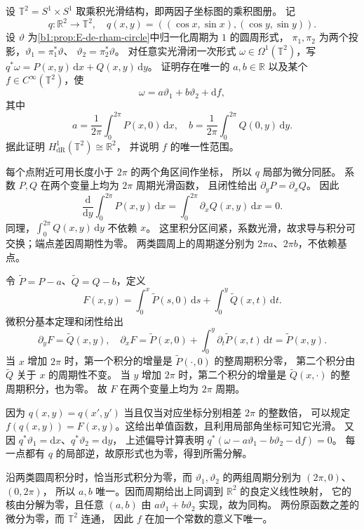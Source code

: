\begin{optionalexercise}\label{b1:ex:E-torus-periods}
设 \(\mathbb T^2=S^1\times S^1\) 取乘积光滑结构，即两因子坐标图的乘积图册。
记
\[
 q:\mathbb R^2\longrightarrow\mathbb T^2,
 \quad q(x,y)=((\cos x,\sin x),(\cos y,\sin y)).
\]
设 \(\vartheta\) 为\cref{b1:prop:E-de-rham-circle}中归一化周期为 \(1\) 的圆周形式，
\(\pi_1,\pi_2\) 为两个投影，\(\vartheta_1=\pi_1^*\vartheta\)、
\(\vartheta_2=\pi_2^*\vartheta\)。
对任意实光滑闭一次形式 \(\omega\in\Omega^1(\mathbb T^2)\)，写
\(q^*\omega=P(x,y)\,\mathrm dx+Q(x,y)\,\mathrm dy\)。
证明存在唯一的 \(a,b\in\mathbb R\) 以及某个
\(f\in C^\infty(\mathbb T^2)\)，使
\[
 \omega=a\vartheta_1+b\vartheta_2+\mathrm df,
\]
其中
\[
 a=\frac1{2\pi}\int_0^{2\pi}P(x,0)\,\mathrm dx,
 \quad b=\frac1{2\pi}\int_0^{2\pi}Q(0,y)\,\mathrm dy.
\]
据此证明 \(H^1_{\mathrm{dR}}(\mathbb T^2)\cong\mathbb R^2\)，
并说明 \(f\) 的唯一性范围。
\end{optionalexercise}
\begin{solution}
每个点附近可用长度小于 \(2\pi\) 的两个角区间作坐标，
所以 \(q\) 局部为微分同胚。
系数 \(P,Q\) 在两个变量上均为 \(2\pi\) 周期光滑函数，
且闭性给出 \(\partial_yP=\partial_xQ\)。
因此
\[
 \frac{\mathrm d}{\mathrm dy}\int_0^{2\pi}P(x,y)\,\mathrm dx
 =\int_0^{2\pi}\partial_xQ(x,y)\,\mathrm dx=0.
\]
同理，\(\int_0^{2\pi}Q(x,y)\,\mathrm dy\) 不依赖 \(x\)。
这里积分区间紧，系数光滑，故求导与积分可交换；端点差因周期性为零。
两类圆周上的周期遂分别为 \(2\pi a\)、\(2\pi b\)，不依赖基点。

令 \(\widetilde P=P-a\)、\(\widetilde Q=Q-b\)，定义
\[
 F(x,y)=\int_0^x\widetilde P(s,0)\,\mathrm ds
             +\int_0^y\widetilde Q(x,t)\,\mathrm dt.
\]
微积分基本定理和闭性给出
\[
 \partial_yF=\widetilde Q(x,y),\quad
 \partial_xF=\widetilde P(x,0)
       +\int_0^y\partial_t\widetilde P(x,t)\,\mathrm dt
       =\widetilde P(x,y).
\]
当 \(x\) 增加 \(2\pi\) 时，第一个积分的增量是 \(\widetilde P(\cdot,0)\) 的整周期积分零，
第二个积分由 \(\widetilde Q\) 关于 \(x\) 的周期性不变。
当 \(y\) 增加 \(2\pi\) 时，第二个积分的增量是
\(\widetilde Q(x,\cdot)\) 的整周期积分，也为零。
故 \(F\) 在两个变量上均为 \(2\pi\) 周期。

因为 \(q(x,y)=q(x',y')\) 当且仅当对应坐标分别相差 \(2\pi\) 的整数倍，
可以规定 \(f(q(x,y))=F(x,y)\)。这给出单值函数，且利用局部角坐标可知它光滑。
又因 \(q^*\vartheta_1=\mathrm dx\)、\(q^*\vartheta_2=\mathrm dy\)，
上述偏导计算表明
\(q^*(\omega-a\vartheta_1-b\vartheta_2-\mathrm df)=0\)。
每一点都有 \(q\) 的局部逆，故原形式也为零，得到所需分解。

沿两类圆周积分时，恰当形式积分为零，而
\(\vartheta_1,\vartheta_2\) 的两组周期分别为 \((2\pi,0)\)、\((0,2\pi)\)，
所以 \(a,b\) 唯一。因而周期给出上同调到 \(\mathbb R^2\) 的良定义线性映射，
它的核由分解为零，且任意 \((a,b)\) 由 \(a\vartheta_1+b\vartheta_2\) 实现，故为同构。
两份原函数之差的微分为零，而 \(\mathbb T^2\) 连通，
因此 \(f\) 在加一个常数的意义下唯一。
\end{solution}

